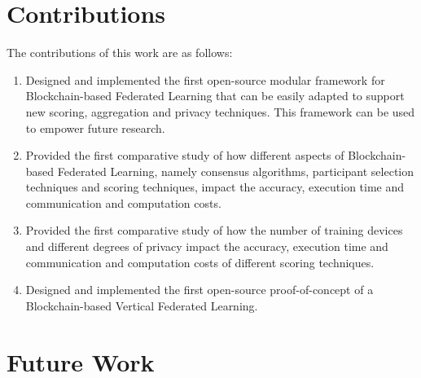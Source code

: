 
\section{Contributions}\label{conclusions:contributions}

The contributions of this work are as follows:

\begin{enumerate}
    \item Designed and implemented the first open-source modular framework for Blockchain-based Federated Learning that can be easily adapted to support new scoring, aggregation and privacy techniques. This framework can be used to empower future research.
    
    \item Provided the first comparative study of how different aspects of Blockchain-based Federated Learning, namely consensus algorithms, participant selection techniques and scoring techniques, impact the accuracy, execution time and communication and computation costs.
    
    \item Provided the first comparative study of how the number of training devices and different degrees of privacy impact the accuracy, execution time and communication and computation costs of different scoring techniques.
    
    \item Designed and implemented the first open-source proof-of-concept of a Blockchain-based Vertical Federated Learning.
\end{enumerate}

\section{Future Work}\label{conclusions:future_work}


